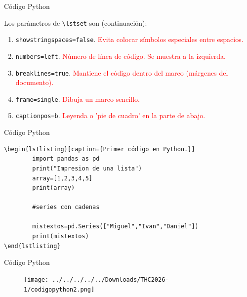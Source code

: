 \documentclass[aspectratio=169, 10pt]{beamer}
\begin{document}
\begin{frame}[fragile]{Código Python}

Los parámetros de \verb|\lstset| son (continuación):

    \begin{enumerate} \pause
        \item \verb|showstringspaces=false|. \textcolor{red}{Evita colocar símbolos especiales entre espacios.} \pause
        \item \verb|numbers=left|. \textcolor{red} {Número de línea de código. Se muestra a la izquierda.} \pause
        \item \verb|breaklines=true|. \textcolor{red}{Mantiene el código dentro del marco (márgenes del documento).} \pause
        \item \verb|frame=single|. \textcolor{red}{Dibuja un marco sencillo.} \pause
        \item \verb|captionpos=b|. \textcolor{red}{Leyenda o 'pie de cuadro' en la parte de abajo.}
    \end{enumerate}


\end{frame}


\begin{frame}[fragile]{Código Python}

\begin{verbatim}
\begin{lstlisting}[caption={Primer código en Python.}]
		import pandas as pd
		print("Impresion de una lista")
		array=[1,2,3,4,5]
		print(array)

		#series con cadenas

		mistextos=pd.Series(["Miguel","Ivan","Daniel"])
		print(mistextos)    
\end{lstlisting}
\end{verbatim}

\end{frame}


\begin{frame}[fragile]{Código Python}

\begin{figure}
	\centering
	\texttt{[image: ../../../../../Downloads/THC2026-1/codigopython2.png]} 
\end{figure}
\end{frame}
\end{document}
